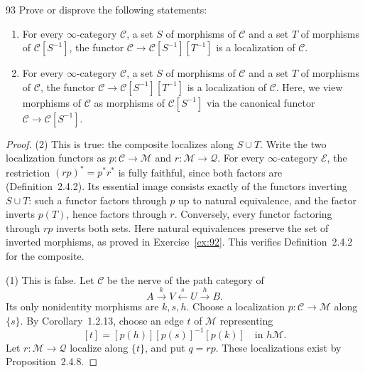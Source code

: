 \begin{exercise}{93}
Prove or disprove the following statements:
\begin{enumerate}[label=(\arabic*)]
\item For every $\infty$-category $\mathcal C$, a set $S$ of morphisms of $\mathcal C$
and a set $T$ of morphisms of $\mathcal C[S^{-1}]$, the functor
$\mathcal C\to\mathcal C[S^{-1}][T^{-1}]$ is a localization of $\mathcal C$.
\item For every $\infty$-category $\mathcal C$, a set $S$ of morphisms of $\mathcal C$
and a set $T$ of morphisms of $\mathcal C$, the functor
$\mathcal C\to\mathcal C[S^{-1}][T^{-1}]$ is a localization of $\mathcal C$.
Here, we view morphisms of $\mathcal C$ as morphisms of $\mathcal C[S^{-1}]$
via the canonical functor $\mathcal C\to\mathcal C[S^{-1}]$.
\end{enumerate}

\begin{proof}
(2) This is true: the composite localizes along $S\cup T$.
Write the two localization functors as $p\colon\mathcal C\to\mathcal M$
and $r\colon\mathcal M\to\mathcal Q$.
For every $\infty$-category $\mathcal E$, the restriction
$(rp)^*=p^*r^*$ is fully faithful, since both factors are
(Definition~2.4.2).
Its essential image consists exactly of the functors inverting $S\cup T$:
such a functor factors through $p$ up to natural equivalence,
and the factor inverts $p(T)$, hence factors through $r$.
Conversely, every functor factoring through $rp$ inverts both sets.
Here natural equivalences preserve the set of inverted morphisms,
as proved in Exercise~\ref{ex:92}.
This verifies Definition~2.4.2 for the composite.

(1) This is false.
Let $\mathcal C$ be the nerve of the path category of
\[
 A\xrightarrow{k}V\xleftarrow{s}U\xrightarrow{h}B.
\]
Its only nonidentity morphisms are $k,s,h$.
Choose a localization $p\colon\mathcal C\to\mathcal M$ along $\{s\}$.
By Corollary~1.2.13, choose an edge $t$ of $\mathcal M$ representing
\[
 [t]=[p(h)][p(s)]^{-1}[p(k)]\quad\text{in }h\mathcal M.
\]
Let $r\colon\mathcal M\to\mathcal Q$ localize along $\{t\}$, and put $q=rp$.
These localizations exist by Proposition~2.4.8.


\end{proof}
\end{exercise}
